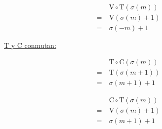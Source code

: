 \begin{center}
\begin{multicols}{2}
			\begin{align*}
			&\ \text{V}\circ\text{T}(\sigma(m))\\
			=&\ \text{V}(\sigma(m)+1)\\
			=&\ \sigma(-m)+1
			\end{align*}
		\end{multicols}
		
		\underline{T y C conmutan:}
		\vspace*{-\bigskipamount}
		\begin{multicols}{2}
			\begin{align*}
			&\ \text{T}\circ\text{C}(\sigma(m))\\
			=&\ \text{T}(\sigma(m+1))\\
			=&\ \sigma(m+1)+1
			\end{align*}
			
			\begin{align*}
			&\ \text{C}\circ\text{T}(\sigma(m))\\
			=&\ \text{V}(\sigma(m)+1)\\
			=&\ \sigma(m+1)+1
			\end{align*}
		\end{multicols}
	\end{center}
